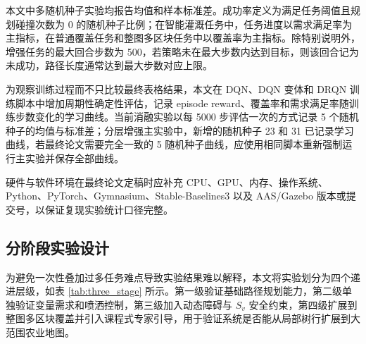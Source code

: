 \documentclass[UTF8]{ctexart}
\begin{document}
本文中多随机种子实验均报告均值和样本标准差。成功率定义为满足任务阈值且规划碰撞次数为 0 的随机种子比例；在智能灌溉任务中，任务进度以需求满足率为主指标，在普通覆盖任务和整图多区块任务中以覆盖率为主指标。除特别说明外，增强任务的最大回合步数为 500，若策略未在最大步数内达到目标，则该回合记为未成功，路径长度通常达到最大步数对应上限。

为观察训练过程而不只比较最终表格结果，本文在 DQN、DQN 变体和 DRQN 训练脚本中增加周期性确定性评估，记录 episode reward、覆盖率和需求满足率随训练步数变化的学习曲线。当前消融实验以每 5000 步评估一次的方式记录 5 个随机种子的均值与标准差；分层增强主实验中，新增的随机种子 23 和 31 已记录学习曲线，若最终论文需要完全一致的 5 随机种子曲线，应使用相同脚本重新强制运行主实验并保存全部曲线。

硬件与软件环境在最终论文定稿时应补充 CPU、GPU、内存、操作系统、Python、PyTorch、Gymnasium、Stable-Baselines3 以及 AAS/Gazebo 版本或提交号，以保证复现实验统计口径完整。

\subsection{分阶段实验设计}

为避免一次性叠加过多任务难点导致实验结果难以解释，本文将实验划分为四个递进层级，如表 \ref{tab:three_stage} 所示。第一级验证基础路径规划能力，第二级单独验证变量需求和喷洒控制，第三级加入动态障碍与 $S_v$ 安全约束，第四级扩展到整图多区块覆盖并引入课程式专家引导，用于验证系统是否能从局部树行扩展到大范围农业地图。

\begin{table}[H]
\centering
\caption{分阶段实验结构}
\label{tab:three_stage}
\end{table}
\end{document}
